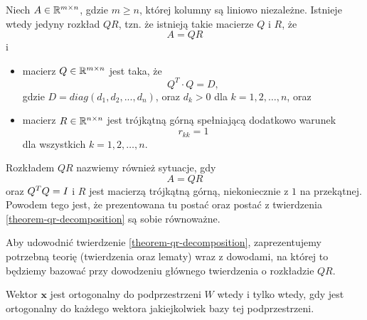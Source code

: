 \documentclass[12pt,a4paper]{report}
\newcommand{\vr}[1]{\mathbf{#1}}
\newcommand{\mx}[1]{{#1}}
\begin{document}
\begin{theorem}[O rozkładzie QR]\label{theorem-qr-decomposition}
Niech $\mx{A} \in \setR^{m \times n}$, gdzie $m\ge n$, której kolumny są liniowo niezależne. Istnieje wtedy jedyny rozkład $\mx{QR}$, tzn. że istnieją takie macierze $\mx{Q}$ i $\mx{R}$, że
$$
\mx{A} = \mx{Q} \mx{R}
$$ 
i
\begin{itemize}
\item macierz $\mx{Q} \in \setR^{m \times n} $ jest taka, że 
$$
Q^{T}\cdot Q=D,
$$
gdzie $D= diag (d_{1}, d_{2}, ..., d_{n})$, oraz $d_{k}>0$ dla $k = 1, 2, \ldots, n$, oraz
\item macierz $\mx{R} \in \setR^{n \times n}$ jest trójkątną górną spełniającą dodatkowo warunek 
$$
r_{kk}= 1 
$$ 
dla wszystkich $k = 1, 2, \ldots, n$.
\end{itemize} 
\end{theorem}

\begin{remark}
Rozkładem $\mx{QR}$ nazwiemy również sytuacje, gdy 
$$
\mx{A}=\mx{Q}\mx{R}
$$
oraz $\transpose{\mx{Q}}\mx{Q}=\mx{I}$ i $\mx{R}$ jest macierzą trójkątną górną, niekoniecznie z $1$ na przekątnej. Powodem tego jest, że prezentowana tu postać oraz postać z twierdzenia \ref{theorem-qr-decomposition} są sobie równoważne.  
\end{remark}

Aby udowodnić twierdzenie \ref{theorem-qr-decomposition}, zaprezentujemy potrzebną teorię (twierdzenia oraz lematy) wraz z dowodami, na której to będziemy bazować przy dowodzeniu głównego twierdzenia o rozkładzie $QR$. 

\begin{theorem}
Wektor $\vr{x}$ jest ortogonalny do podprzestrzeni $W$ wtedy i tylko wtedy, gdy jest ortogonalny do każdego wektora jakiejkolwiek bazy tej podprzestrzeni.
\end{theorem}
\end{document}
